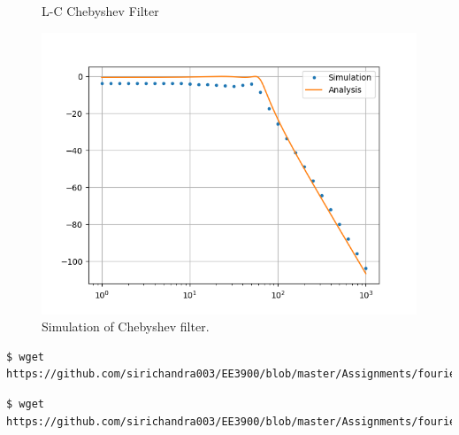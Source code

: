 \documentclass[journal,12pt,twocolumn]{IEEEtran}
\renewcommand\thesection{\arabic{section}}
\begin{document}
\begin{enumerate}[label=\thesection.\arabic*
,ref=\thesection.\theenumi]
\begin{figure}[!ht]
    \caption{L-C Chebyshev Filter}
    \label{fig:cheby-filter}
\end{figure}
\begin{figure}
    \includegraphics[width=\columnwidth]{figs/5.4.png}
    \caption{Simulation of Chebyshev filter.}
    \label{fig:sim-cheby}
\end{figure}
\begin{lstlisting}
$ wget https://github.com/sirichandra003/EE3900/blob/master/Assignments/fourier%20series/codes/5.4.py
\end{lstlisting}
\begin{lstlisting}
$ wget https://github.com/sirichandra003/EE3900/blob/master/Assignments/fourier%20series/codes/5.4.cir
\end{lstlisting}
\end{enumerate}
\end{document}
